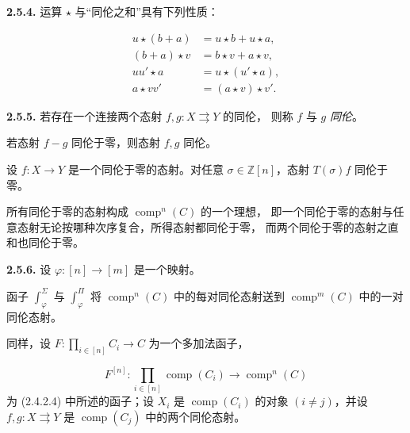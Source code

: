 \clearpage
{}%
\noindent\textbf{2.5.4.}\quad
运算 $\star$ 与“同伦之和”具有下列性质：

\begin{equation}
  \begin{aligned}
    u\star(b+a) &= u\star b+u\star a,\\
    (b+a)\star v &= b\star v+a\star v,\\
    uu'\star a &= u\star(u'\star a),\\
    a\star vv' &= (a\star v)\star v'.
  \end{aligned}
  \tag{2.5.4.1}
\end{equation}

\noindent\textbf{2.5.5.}\quad
若存在一个连接两个态射 $f,g\colon X\rightrightarrows Y$ 的同伦，
则称 $f$ 与 $g$ \emph{同伦}。

若态射 $f-g$ 同伦于零，则态射 $f,g$ 同伦。

设 $f\colon X\longrightarrow Y$ 是一个同伦于零的态射。对任意
$\sigma\in\mathbb Z[n]$，态射 $T(\sigma)f$ 同伦于零。

所有同伦于零的态射构成 $\operatorname{comp}^{n}(C)$ 的一个理想，
即一个同伦于零的态射与任意态射无论按哪种次序复合，所得态射都同伦于零，
而两个同伦于零的态射之直和也同伦于零。

\noindent\textbf{2.5.6.}\quad
设 $\varphi\colon[n]\longrightarrow[m]$ 是一个映射。

函子 $\int_\varphi^\Sigma$ 与 $\int_\varphi^\Pi$ 将
$\operatorname{comp}^{n}(C)$ 中的每对同伦态射送到
$\operatorname{comp}^{m}(C)$ 中的一对同伦态射。

同样，设
$F\colon\prod_{i\in[n]}C_i\longrightarrow C$ 为一个多加法函子，

\begin{equation*}
  F^{[n]}\colon
  \prod_{i\in[n]}\operatorname{comp}(C_i)
  \longrightarrow \operatorname{comp}^{n}(C)
\end{equation*}
为 (2.4.2.4) 中所述的函子；设 $X_i$ 是
$\operatorname{comp}(C_i)$ 的对象 $(i\ne j)$，并设
$f,g\colon X\rightrightarrows Y$ 是 $\operatorname{comp}(C_j)$
中的两个同伦态射。

